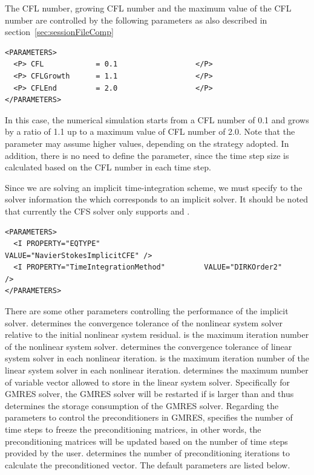 The CFL number, growing CFL number and the maximum value of the CFL number 
are controlled by the following parameters as also described in section~\ref{sec:sessionFileComp}
\begin{lstlisting}[style=XmlStyle]
<PARAMETERS>
  <P> CFL            = 0.1                  </P>
  <P> CFLGrowth      = 1.1                  </P>
  <P> CFLEnd         = 2.0                  </P>
</PARAMETERS>
\end{lstlisting}
In this case, the numerical simulation starts from a CFL number of 0.1 and grows 
by a ratio of 1.1 up to a maximum value of CFL number of 2.0. Note that the 
 parameter may assume higher values, depending on the strategy 
adopted. In addition, there is no need to define the  parameter, 
since the time step size is calculated based on the CFL number in each time step.

Since we are solving an implicit time-integration scheme, we must specify to 
the solver information the  which corresponds to an implicit solver. 
It should be noted that currently the CFS solver only supports 
 and .
\begin{lstlisting}[style=XmlStyle]
<PARAMETERS>
  <I PROPERTY="EQTYPE"                        VALUE="NavierStokesImplicitCFE" />
  <I PROPERTY="TimeIntegrationMethod"         VALUE="DIRKOrder2"              />
</PARAMETERS>
\end{lstlisting}

There are some other parameters controlling the performance of the implicit 
solver.  determines the convergence tolerance 
of the nonlinear system solver relative to the initial nonlinear system residual. 
 is the maximum iteration number of the 
nonlinear system solver.  determines the 
convergence tolerance of linear system solver in each nonlinear iteration. 
 is the maximum iteration number of the linear 
system solver in each nonlinear iteration.  determines 
the maximum number of variable vector allowed to store in the linear system 
solver. Specifically for GMRES solver, the GMRES solver will be restarted if 
 is larger than  and thus 
 determines the storage consumption of the GMRES solver. 
Regarding the parameters to control the preconditioners in GMRES, 
 specifies the number of time steps to freeze the 
preconditioning matrices, in other words, the preconditioning matrices will be 
updated based on the number of time steps provided by the user.  
determines the number of preconditioning iterations to calculate the
preconditioned vector. The default parameters are listed below. 

